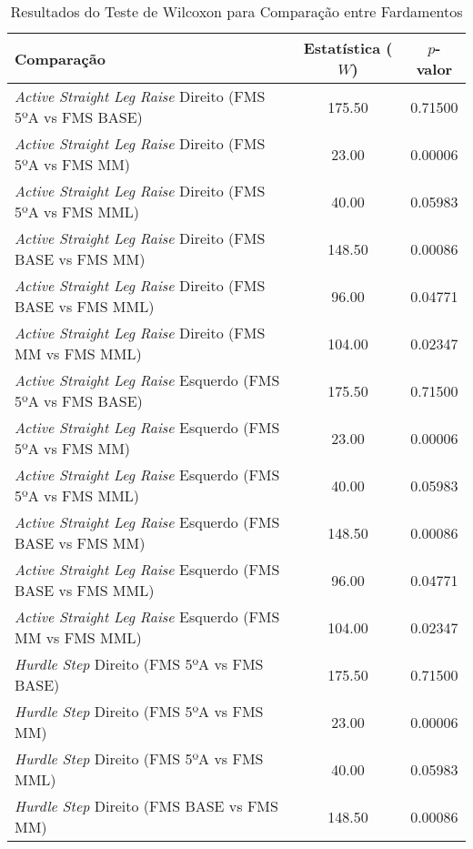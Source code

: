         \begin{table}[H]
            \centering
            \caption{Resultados do Teste de Wilcoxon para Comparação entre Fardamentos}
            \label{tab:wilcoxon}
            \begin{tabular}{lcc}
                \hline
                \textbf{Comparação} & \textbf{Estatística ($W$)} & \textbf{$p$-valor} \\
                \hline
                \textit{Active Straight Leg Raise} Direito (FMS 5ºA vs FMS BASE) & 175.50 & 0.71500 \\
                \textit{Active Straight Leg Raise} Direito (FMS 5ºA vs FMS MM) & 23.00 & 0.00006 \\
                \textit{Active Straight Leg Raise} Direito (FMS 5ºA vs FMS MML) & 40.00 & 0.05983 \\
                \textit{Active Straight Leg Raise} Direito (FMS BASE vs FMS MM) & 148.50 & 0.00086 \\
                \textit{Active Straight Leg Raise} Direito (FMS BASE vs FMS MML) & 96.00 & 0.04771 \\
                \textit{Active Straight Leg Raise} Direito (FMS MM vs FMS MML) & 104.00 & 0.02347 \\
                \textit{Active Straight Leg Raise} Esquerdo (FMS 5ºA vs FMS BASE) & 175.50 & 0.71500 \\
                \textit{Active Straight Leg Raise} Esquerdo (FMS 5ºA vs FMS MM) & 23.00 & 0.00006 \\
                \textit{Active Straight Leg Raise} Esquerdo (FMS 5ºA vs FMS MML) & 40.00 & 0.05983 \\
                \textit{Active Straight Leg Raise} Esquerdo (FMS BASE vs FMS MM) & 148.50 & 0.00086 \\
                \textit{Active Straight Leg Raise} Esquerdo (FMS BASE vs FMS MML) & 96.00 & 0.04771 \\
                \textit{Active Straight Leg Raise} Esquerdo (FMS MM vs FMS MML) & 104.00 & 0.02347 \\
                \textit{Hurdle Step} Direito (FMS 5ºA vs FMS BASE) & 175.50 & 0.71500 \\
                \textit{Hurdle Step} Direito (FMS 5ºA vs FMS MM) & 23.00 & 0.00006 \\
                \textit{Hurdle Step} Direito (FMS 5ºA vs FMS MML) & 40.00 & 0.05983 \\
                \textit{Hurdle Step} Direito (FMS BASE vs FMS MM) & 148.50 & 0.00086 \\

\end{tabular}
\end{table}
